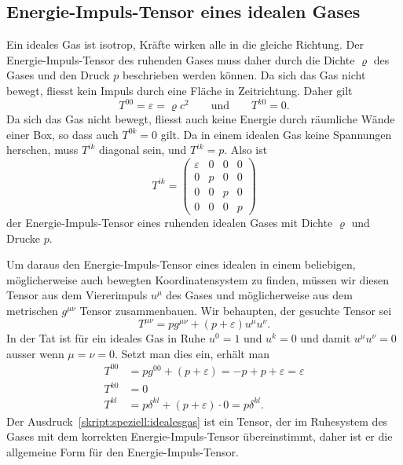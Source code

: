 %

\subsection{Energie-Impuls-Tensor eines idealen Gases%
\label{skript:speziell:subsection:idealesgas}}
Ein ideales Gas ist isotrop, Kräfte wirken alle in die gleiche
Richtung.
Der Energie-Impuls-Tensor des ruhenden Gases muss daher durch die
Dichte $\varrho$ des Gases und den Druck $p$ beschrieben werden können.
Da sich das Gas nicht bewegt, fliesst kein Impuls durch eine Fläche
in Zeitrichtung.
Daher gilt
\[
T^{00}
=
\varepsilon
=
\varrho c^2
\qquad
\text{und}
\qquad
T^{k0}
=
0.
\]
Da sich das Gas nicht bewegt, fliesst auch keine Energie durch räumliche
Wände einer Box, so dass auch $T^{0k}=0$ gilt.
Da in einem idealen Gas keine Spannungen herschen, muss $T^{ik}$ diagonal
sein, und $T^{ik}=p$.
Also ist
\[
T^{ik}
=
\begin{pmatrix}
\varepsilon&0&0&0\\
0&p&0&0\\
0&0&p&0\\
0&0&0&p
\end{pmatrix}
\]
der Energie-Impuls-Tensor eines ruhenden idealen Gases mit Dichte
$\varrho$ und Drucke $p$.

Um daraus den Energie-Impuls-Tensor eines idealen in einem
beliebigen, möglicherweise auch bewegten Koordinatensystem zu
finden, müssen wir diesen Tensor aus dem Viererimpuls $u^\mu$
des Gases und möglicherweise aus dem metrischen $g^{\mu\nu}$ Tensor
zusammenbauen.
Wir behaupten, der gesuchte Tensor sei
\begin{equation}
T^{\mu\nu}
=
p g^{\mu\nu} + (p + \varepsilon)u^\mu u^\nu.
\label{skript:speziell:idealesgas}
\end{equation}
In der Tat ist für ein ideales Gas in Ruhe $u^0=1$ und $u^k=0$ und damit
$u^\mu u^\nu=0$ ausser wenn $\mu=\nu=0$.
Setzt man dies ein, erhält man
\begin{align*}
T^{00}
&=
pg^{00} + (p+\varepsilon) = -p+p+\varepsilon=\varepsilon
\\
T^{k0}
&=0
\\
T^{kl}
&=
p\delta^{kl}
+
(p+\varepsilon)\cdot 0
=
p\delta^{kl}.
\end{align*}
Der Ausdruck~\eqref{skript:speziell:idealesgas} ist ein Tensor, der
im Ruhesystem des Gases mit dem korrekten Energie-Impuls-Tensor
übereinstimmt,
daher ist er die allgemeine Form für den Energie-Impuls-Tensor.

